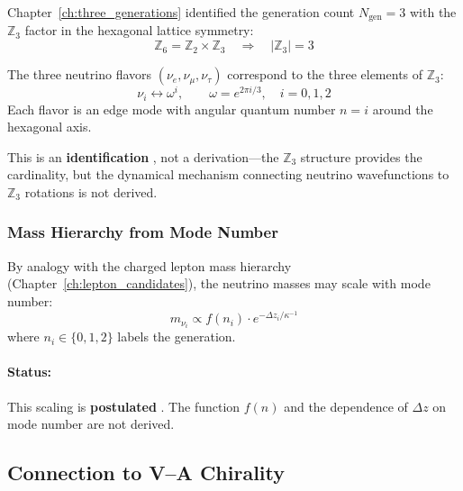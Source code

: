 Chapter~\ref{ch:three_generations} identified the generation count $N_{\text{gen}} = 3$
with the $\mathbb{Z}_3$ factor in the hexagonal lattice symmetry:
\begin{equation}
    \mathbb{Z}_6 = \mathbb{Z}_2 \times \mathbb{Z}_3
    \quad\Longrightarrow\quad
    |\mathbb{Z}_3| = 3
    \label{eq:ch6_z3}
\end{equation}

\begin{postulate}
\label{post:ch6_three_nu}
The three neutrino flavors $(\nu_e, \nu_\mu, \nu_\tau)$ correspond to the
three elements of $\mathbb{Z}_3$:
\begin{equation}
    \nu_i \leftrightarrow \omega^i, \qquad \omega = e^{2\pi i/3}, \quad i = 0, 1, 2
\end{equation}
Each flavor is an edge mode with angular quantum number $n = i$ around the
hexagonal axis.
\end{postulate}

This is an \textbf{identification} \tagI{}, not a derivation---the $\mathbb{Z}_3$
structure provides the cardinality, but the dynamical mechanism connecting
neutrino wavefunctions to $\mathbb{Z}_3$ rotations is not derived.

\subsubsection{Mass Hierarchy from Mode Number}

By analogy with the charged lepton mass hierarchy (Chapter~\ref{ch:lepton_candidates}),
the neutrino masses may scale with mode number:
\begin{equation}
    m_{\nu_i} \propto f(n_i) \cdot e^{-\Delta z_i/\kappa^{-1}}
    \label{eq:ch6_nu_hierarchy}
\end{equation}
where $n_i \in \{0, 1, 2\}$ labels the generation.

\paragraph{Status:} This scaling is \textbf{postulated} \tagP{}. The function $f(n)$
and the dependence of $\Delta z$ on mode number are not derived.

\subsection{Connection to V--A Chirality}
\label{sec:ch6_va_connection}

